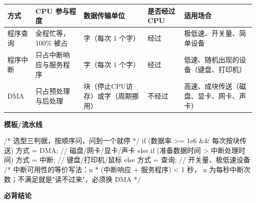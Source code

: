 \documentclass[10pt,a4paper]{ctexart}
\begin{document}
\begin{center}\small
\begin{tabularx}{\linewidth}{@{}l>{\raggedright\arraybackslash}X>{\raggedright\arraybackslash}Xl>{\raggedright\arraybackslash}X@{}}
\toprule
方式 & CPU 参与程度 & 数据传输单位 & 是否经过 CPU & 适用场合 \\
\midrule
程序查询 & 全程忙等，100\% 被占 & 字（每次 1 个字） & 经过 & 极低速、开关量、简单设备 \\
程序中断 & 只占中断响应与服务程序 & 字（每次 1 个字） & 经过 & 低速、随机出现的设备（键盘、打印机） \\
DMA & 只占预处理与后处理 & 块（停止CPU访存）或字（周期挪用） & 不经过 & 高速、成块传送（磁盘、显卡、网卡、声卡） \\
\bottomrule
\end{tabularx}
\end{center}


\textbf{模板/流水线}

\begin{codebox}
/* 选型三判据，按顺序问，问到一个就停 */
if (数据率 >= 1e6 && 每次按块传送)        方式 = DMA;   // 磁盘/网卡/显卡/声卡
else if (准备数据时间 > 中断处理时间)     方式 = 中断;  // 键盘/打印机/鼠标
else                                      方式 = 查询;  // 开关量、极低速设备
/* 中断可用性的等价写法：n * (中断响应 + 服务程序) < 1 秒，
   n 为每秒中断次数；不满足就是"读不过来"，必须换 DMA */
\end{codebox}




\textbf{必背结论}
\end{document}
